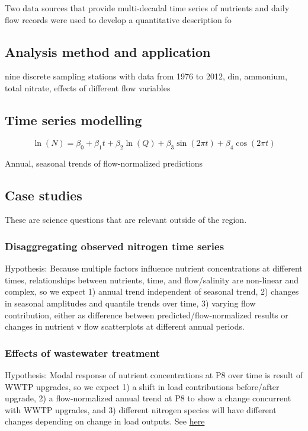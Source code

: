 \documentclass[letterpaper,12pt,oneside]{article}\usepackage[]{graphicx}\usepackage[]{color}
\begin{document}
Two data sources that provide multi-decadal time series of nutrients and daily flow records were used to develop a quantitative description fo    

\subsection{Analysis method and application}

nine discrete sampling stations with data from 1976 to 2012, \ac{din}, ammonium, total nitrate, effects of different flow variables

\subsection{Time series modelling}

\begin{equation}
\ln\left(N\right) = \beta_0 + \beta_1 t + \beta_2 \ln\left(Q\right) + \beta_3 \sin\left(2\pi t\right) + \beta_4 \cos\left(2\pi t\right)
\end{equation}  

Annual, seasonal trends of flow-normalized predictions

\subsection{Case studies}
These are science questions that are relevant outside of the region.
\subsubsection{Disaggregating observed nitrogen time series}
Hypothesis: Because multiple factors influence nutrient concentrations at different times, relationships between nutrients, time, and flow/salinity are non-linear and complex, so we expect 1) annual trend independent of seasonal trend, 2) changes in seasonal amplitudes and quantile trends over time, 3) varying flow contribution, either as difference between predicted/flow-normalized results or changes in nutrient v flow scatterplots at different annual periods.
\subsubsection{Effects of wastewater treatment}
Hypothesis: Modal response of nutrient concentrations at P8 over time is result of WWTP upgrades, so we expect 1) a shift in load contributions before/after upgrade, 2) a flow-normalized annual trend at P8 to show a change concurrent with WWTP upgrades, and 3) different nitrogen species will have different changes depending on change in load outputs. See \href{http://www.waterboards.ca.gov/centralvalley/board_decisions/adopted_orders/san_joaquin/r5-2008-0086_res.pdf}{here}
\end{document}

